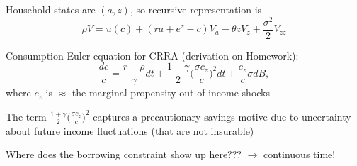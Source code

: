 \documentclass[11pt, aspectratio=169]{beamer}
\newenvironment{witemize}{\itemize\addtolength{\itemsep}{10pt}}{\enditemize}
\begin{document}
\begin{frame}{}
\begin{witemize}
\item Household states are $(a, z)$, so recursive representation is 
\begin{equation*}
	\rho V = u(c) + (r a + e^z - c) V_a - \theta z V_z + \frac{\sigma^2}{2} V_{zz}
\end{equation*}

% 
% 
% 
% 

\item Consumption Euler equation for CRRA (derivation on Homework):
\begin{equation*}
	\frac{dc}{c} = \frac{r - \rho}{\gamma} dt + \frac{1+\gamma}{2} \bigg( \frac{\sigma c_z}{c} \bigg)^2 dt + \frac{c_z}{c} \sigma dB,
\end{equation*}
where $c_z$ is $\approx$ the marginal propensity out of income shocks

\item The term $ \frac{1+\gamma}{2} \big( \frac{\sigma c_z}{c} \big)^2$ captures a precautionary savings motive due to uncertainty about future income fluctuations (that are not insurable)

\item Where does the borrowing constraint show up here??? $\to$ continuous time!
\end{witemize}
\end{frame}
\end{document}
